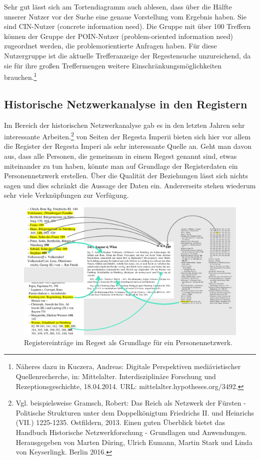 \documentclass[12pt,ngerman,]{article}
\begin{document}
Sehr gut lässt sich am Tortendiagramm auch ablesen, dass über die Hälfte
unserer Nutzer vor der Suche eine genaue Vorstellung vom Ergebnis haben.
Sie sind CIN-Nutzer (concrete information need). Die Gruppe mit über 100
Treffern können der Gruppe der POIN-Nutzer (problem-oriented information
need) zugeordnet werden, die problemorientierte Anfragen haben. Für
diese Nutzergruppe ist die aktuelle Trefferanzeige der Regestensuche
unzureichend, da sie für ihre großen Treffermengen weitere
Einschränkungsmöglichkeiten brauchen.\footnote{Näheres dazu in Kuczera,
  Andreas: Digitale Perspektiven mediävistischer Quellenrecherche, in:
  Mittelalter. Interdisziplinäre Forschung und Rezeptionsgeschichte,
  18.04.2014. URL: mittelalter.hypotheses.org/3492.}

\subsection{Historische Netzwerkanalyse in den
Registern}\label{historische-netzwerkanalyse-in-den-registern}

Im Bereich der historischen Netzwerkanalyse gab es in den letzten Jahren
sehr interessante Arbeiten.\footnote{Vgl. beispielsweise Gramsch,
  Robert: Das Reich als Netzwerk der Fürsten - Politische Strukturen
  unter dem Doppelkönigtum Friedrichs II. und Heinrichs (VII.)
  1225-1235. Ostfildern, 2013. Einen guten Überblick bietet das Handbuch
  Historische Netzwerkforschung - Grundlagen und Anwendungen.
  Herausgegeben von Marten Düring, Ulrich Eumann, Martin Stark und Linda
  von Keyserlingk. Berlin 2016.} von Seiten der Regesta Imperii bieten
sich hier vor allem die Register der Regesta Imperi als sehr
interessante Quelle an. Geht man davon aus, dass alle Personen, die
gemeinsam in einem Regest genannt sind, etwas miteinander zu tun haben,
könnte man auf Grundlage der Registerdaten ein Personennetzwerk
erstellen. Über die Qualität der Beziehungen lässt sich nichts sagen und
dies schränkt die Aussage der Daten ein. Andererseits stehen wiederum
sehr viele Verknüpfungen zur Verfügung.

\begin{figure}
\centering
\includegraphics{Bilder/Register-und-Regest-19-189.png}
\caption{Registereinträge im Regest als Grundlage für ein
Personennetzwerk.}
\end{figure}
\end{document}
